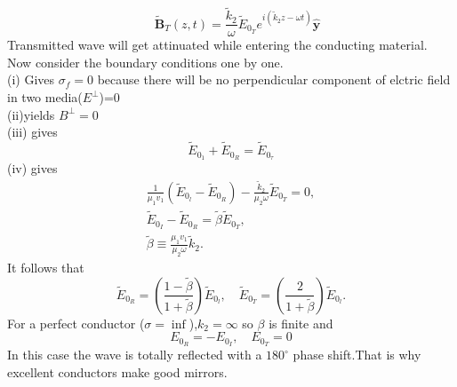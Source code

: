 $$ \quad \tilde{\mathbf{B}}_{T}(z, t)=\frac{\tilde{k}_{2}}{\omega} \tilde{E}_{0_{T}} e^{i\left(\tilde{k}_{2} z-\omega t\right)} \hat{\mathbf{y}}$$
Transmitted wave will get attinuated while entering the conducting material.\\
Now consider the boundary conditions one by one.\\
(i) Gives $\sigma_{f}=0$ because there will be no perpendicular component of elctric field in two media($E^{\perp}$)=0\\
(ii)yields $B^{\perp}=0$\\
(iii) gives $$\tilde{E}_{0_{1}}+\tilde{E}_{0_{R}}=\tilde{E}_{0_{\tau}}$$
(iv) gives $$\begin{gathered}
\frac{1}{\mu_{1} v_{1}}\left(\tilde{E}_{0_{l}}-\tilde{E}_{0_{R}}\right)-\frac{\tilde{k}_{2}}{\mu_{2} \omega} \tilde{E}_{0_{T}}=0, \\
\tilde{E}_{0_{I}}-\tilde{E}_{0_{R}}=\tilde{\beta} \tilde{E}_{0_{T}}, \\
\tilde{\beta} \equiv \frac{\mu_{1} v_{1}}{\mu_{2} \omega} \tilde{k}_{2} .
\end{gathered}$$
It follows that
$$
\tilde{E}_{0_{R}}=\left(\frac{1-\tilde{\beta}}{1+\tilde{\beta}}\right) \tilde{E}_{0_{l}}, \quad \tilde{E}_{0_{T}}=\left(\frac{2}{1+\tilde{\beta}}\right) \tilde{E}_{0_{l}} .
$$
For a perfect conductor ($\sigma=\inf$),$k_2=\infty$ so $\beta$ is finite and \\
$$E_{0_R}=-E_{0_I}, \quad E_{0_T}=0$$
In this case the wave is totally reflected with a $180^{\circ}$ phase shift.That is why excellent conductors make good mirrors.
